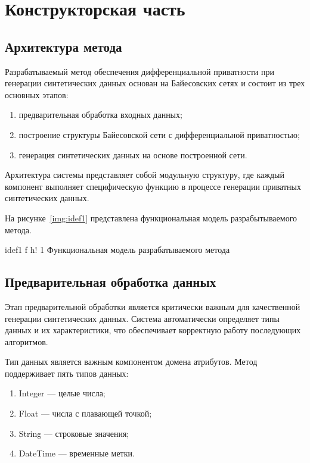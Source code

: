 \chapter{Конструкторская часть}

\section{Архитектура метода}

Разрабатываемый метод обеспечения дифференциальной приватности при генерации синтетических данных основан на Байесовских сетях и состоит из трех основных этапов:
\begin{enumerate}[label*=---]
	\item предварительная обработка входных данных;
	\item построение структуры Байесовской сети с дифференциальной приватностью;
	\item генерация синтетических данных на основе построенной сети.
\end{enumerate}

Архитектура системы представляет собой модульную структуру, где каждый компонент выполняет специфическую функцию в процессе генерации приватных синтетических данных.

На рисунке~\ref{img:idef1} представлена функциональная модель разрабытываемого метода.

{idef1} %
{f} %
{h!} %
{1\textwidth} %
{Функциональная модель разрабатываемого метода} %

\section{Предварительная обработка данных}

Этап предварительной обработки является критически важным для качественной генерации синтетических данных. Система автоматически определяет типы данных и их характеристики, что обеспечивает корректную работу последующих алгоритмов.

Тип данных является важным компонентом домена атрибутов.
Метод поддерживает пять типов данных:
\begin{enumerate}[label*=---]
	\item Integer --- целые числа;
	\item Float --- числа с плавающей точкой;
	\item String --- строковые значения;
	\item DateTime --- временные метки.
\end{enumerate}

